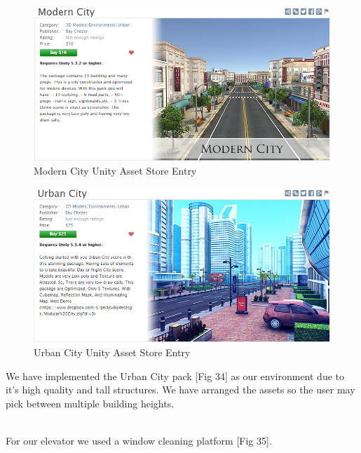 \documentclass[a4paper,10pt]{article}
\begin{document}
\begin{figure}[H] %
	\centerline {\includegraphics[scale = 0.50]{modernCity.png}}
	\caption{Modern City Unity Asset Store Entry}
	\label{fig:modernCity}
\end{figure}
\begin{figure}[H] %
	\centerline {\includegraphics[scale = 0.50]{urbanCity.png}}
	\caption{Urban City Unity Asset Store Entry}
	\label{fig:urbanCity}
\end{figure}
We have implemented the Urban City pack [Fig 34] as our environment due to it's high quality and tall structures. We have arranged the assets so the user may pick between multiple building heights.
\par~\\
For our elevator we used a window cleaning platform [Fig 35].
\end{document}
